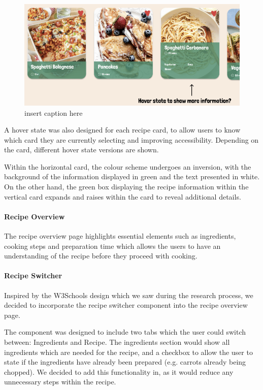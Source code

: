 \documentclass{article}
\begin{document}
\begin{figure}[htbp]
  \includegraphics[width=1.0\textwidth]{assets/Version 1 Vertical Cards.png}
  \centering
  \caption{insert caption here}
\end{figure}

A hover state was also designed for each recipe card, to allow users to know which card they are currently selecting and improving accessibility. Depending on the card, different hover state versions are shown.

Within the horizontal card, the colour scheme undergoes an inversion, with the background of the information displayed in green and the text presented in white. On the other hand, the green box displaying the recipe information within the vertical card expands and raises within the card to reveal additional details.

\paragraph{Recipe Overview}
The recipe overview page highlights essential elements such as ingredients, cooking steps and preparation time which allows the users to have an understanding of the recipe before they proceed with cooking.

\paragraph{Recipe Switcher}
Inspired by the W3Schools design which we saw during the research process, we decided to incorporate the recipe switcher component into the recipe overview page.

The component was designed to include two tabs which the user could switch between: Ingredients and Recipe. The ingredients section would show all ingredients which are needed for the recipe, and a checkbox to allow the user to state if the ingredients have already been prepared (e.g. carrots already being chopped). We decided to add this functionality in, as it would reduce any unnecessary steps within the recipe.
\end{document}
